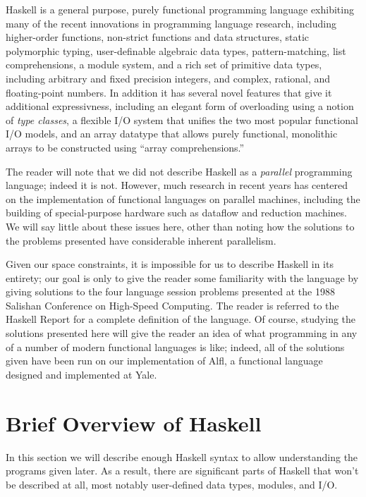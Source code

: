Haskell is a general purpose, purely functional programming language
exhibiting many of the recent innovations in programming language
research, including higher-order functions, non-strict functions and
data structures, static polymorphic typing, user-definable algebraic
data types, pattern-matching, list comprehensions, a module system,
and a rich set of primitive data types, including arbitrary and fixed
precision integers, and complex, rational, and floating-point numbers.
In addition it has several novel features that give it additional
expressivness, including an elegant form of overloading using a notion
of {\em type classes}, a flexible I/O system that unifies the two most
popular functional I/O models, and an array datatype that allows
purely functional, monolithic arrays to be constructed using ``array
comprehensions.''

The reader will note that we did not describe Haskell as a {\em
parallel} programming language; indeed it is not.  However, much
research in recent years has centered on the implementation of
functional languages on parallel machines, including the building of
special-purpose hardware such as dataflow and reduction machines.  We
will say little about these issues here, other than noting how the
solutions to the problems presented have considerable inherent
parallelism.

Given our space constraints, it is impossible for us to describe
Haskell in its entirety; our goal is only to give the reader some
familiarity with the language by giving solutions to the four language
session problems presented at the 1988 Salishan Conference on
High-Speed Computing.  The reader is referred to the Haskell Report
\cite{haskell} for a complete definition of the language.  Of course,
studying the solutions presented here will give the reader an idea of
what programming in any of a number of modern functional languages is
like; indeed, all of the solutions given have been run on our
implementation of Alfl, a functional language designed and implemented
at Yale.

\section{Brief Overview of Haskell}

In this section we will describe enough Haskell syntax to allow
understanding the programs given later.  As a result, there are
significant parts of Haskell that won't be described at all, most
notably user-defined data types, modules, and I/O.

